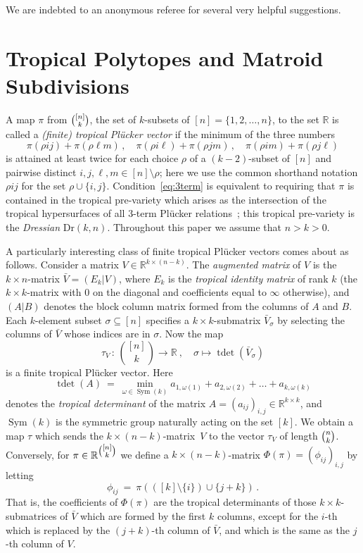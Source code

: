 \documentclass[11pt,a4paper]{amsart}
\newcommand{\RR}{{\mathbb{R}}}
\DeclareMathOperator{\Sym}{Sym}
\DeclareMathOperator{\tdet}{tdet}
\newcommand{\Dr}[2]{{\mathrm{Dr}(#1,#2)}}
\theoremstyle{plain}
\theoremstyle{definition}
\begin{document}
We are indebted to an anonymous referee for several very helpful suggestions.

\section{Tropical Polytopes and Matroid Subdivisions} \label{sec:Polytope}

A map $\pi$ from $\tbinom{[n]}{k}$, the set of $k$-subsets of $[n]=\{1,2,\dots,n\}$, to the set
$\RR$ is called a \emph{(finite) tropical Pl\"ucker vector} if the minimum of the three numbers
\begin{equation}\label{eq:3term}
  \pi(\rho ij)+\pi(\rho\ell m) \, , \quad \pi(\rho i\ell)+\pi(\rho jm) \, , \quad \pi(\rho
  im)+\pi(\rho j\ell)
\end{equation}
is attained at least twice for each choice $\rho$ of a $(k{-}2)$-subset of $[n]$ and pairwise
distinct $i,j,\ell,m\in[n]\setminus\rho$; here we use the common shorthand notation $\rho ij$ for
the set $\rho\cup\{i,j\}$.  Condition~\eqref{eq:3term} is equivalent to requiring that $\pi$ is
contained in the tropical pre-variety which arises as the intersection of the tropical hypersurfaces
of all $3$-term Pl\"ucker relations~\cite{MR2071813}; this tropical pre-variety is the
\emph{Dressian} $\Dr kn$.  Throughout this paper we assume that $n>k>0$.

A particularly interesting class of finite tropical Pl\"ucker vectors comes about as
follows. Consider a matrix $V\in\RR^{k\times (n-k)}$.  The \emph{augmented matrix} of $V$ is the
$k{\times}n$-matrix $\bar V=(E_k|V)$, where $E_k$ is the \emph{tropical identity matrix} of rank $k$
(the $k{\times}k$-matrix with $0$ on the diagonal and coefficients equal to $\infty$ otherwise), and
$(A|B)$ denotes the block column matrix formed from the columns of $A$ and $B$.  Each $k$-element
subset $\sigma\subseteq[n]$ specifies a $k{\times}k$-submatrix $\bar V_\sigma$ by selecting the
columns of $\bar V$ whose indices are in $\sigma$.  Now the map
\begin{equation}
  \label{eq:tau_v}
  \tau_V \,:\, \binom{[n]}{k}\to\RR \ , \quad \sigma \mapsto \tdet(\bar V_\sigma)
\end{equation}
is a finite tropical Pl\"ucker vector.  Here
\begin{equation}\label{eq:tdet}
  \tdet(A) \ = \ \min_{\omega\in\Sym(k)} a_{1,\omega(1)}+a_{2,\omega(2)}+\dots+a_{k,\omega(k)}
\end{equation}
denotes the \emph{tropical determinant} of the matrix $A=(a_{ij})_{i,j}\in\RR^{k\times k}$, and
$\Sym(k)$ is the symmetric group naturally acting on the set $[k]$.  We obtain a map $\tau$ which
sends the $k{\times}(n{-}k)$-matrix~$V$ to the vector $\tau_V$ of length $\tbinom{n}{k}$.
Conversely, for $\pi\in\RR^{\tbinom{[n]}{k}}$ we define a $k{\times}(n{-}k)$-matrix
$\Phi(\pi)=(\phi_{ij})_{i,j}$ by letting
\[
\phi_{ij} \ = \ \pi(([k]\setminus\{i\})\cup\{j+k\}) \, .
\]
That is, the coefficients of $\Phi(\pi)$ are the tropical determinants of those
$k{\times}k$-submatrices of $\bar V$ which are formed by the first $k$ columns, except for the
$i$-th which is replaced by the $(j{+}k)$-th column of $\bar V$, and which is the same as the $j$-th
column of $V$.
\end{document}
